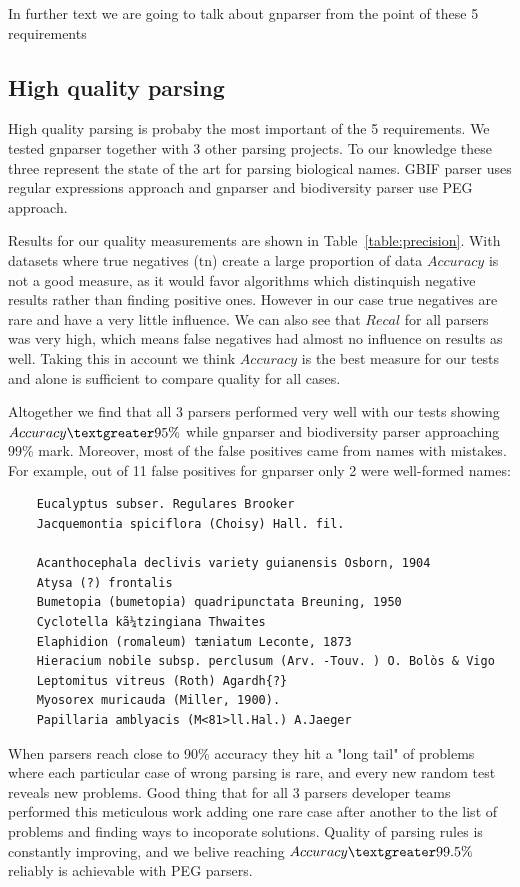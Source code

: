 \documentclass{bmcart}
\begin{document}
In further text we are going to talk about gnparser from the point of these 5
requirements

\subsection*{High quality parsing}

High quality parsing is probaby the most important of the 5 requirements. We
tested gnparser together with 3 other parsing projects. To our knowledge these
three represent the state of the art for parsing biological names. GBIF parser
uses regular expressions approach and gnparser and biodiversity parser use PEG
approach.

Results for our quality measurements are shown in Table~\ref{table:precision}.
With datasets where true negatives ($\text{tn}$) create a large proportion of
data $Accuracy$ is not a good measure, as it would favor algorithms which
distinquish negative results rather than finding positive ones. However in our
case true negatives are rare and have a very little influence. We can also see
that $Recal$ for all parsers was very high, which means false negatives had
almost no influence on results as well. Taking this in account we think
$Accuracy$ is the best measure for our tests and alone is sufficient to
compare quality for all cases.

Altogether we find that all 3 parsers performed very well with our tests
showing $Accuracy \textgreater 95\%$ while gnparser and biodiversity parser
approaching 99\% mark. Moreover, most of the false positives came from names
with mistakes. For example, out of 11 false positives for gnparser only 2 were
well-formed names:

\begin{verbatim}
    Eucalyptus subser. Regulares Brooker
    Jacquemontia spiciflora (Choisy) Hall. fil.

    Acanthocephala declivis variety guianensis Osborn, 1904
    Atysa (?) frontalis
    Bumetopia (bumetopia) quadripunctata Breuning, 1950
    Cyclotella kã¼tzingiana Thwaites
    Elaphidion (romaleum) tæniatum Leconte, 1873
    Hieracium nobile subsp. perclusum (Arv. -Touv. ) O. Bolòs & Vigo
    Leptomitus vitreus (Roth) Agardh{?}
    Myosorex muricauda (Miller, 1900).
    Papillaria amblyacis (M<81>ll.Hal.) A.Jaeger
\end{verbatim}

When parsers reach close to 90\% accuracy they hit a "long tail" of problems
where each particular case of wrong parsing is rare, and every new random test
reveals new problems. Good thing that for all 3 parsers developer teams
performed this meticulous work adding one rare case after another to the list
of problems and finding ways to incoporate solutions. Quality of parsing rules
is constantly improving, and we belive reaching  $Accuracy \textgreater
99.5\%$ reliably is achievable with PEG parsers.
\end{document}
